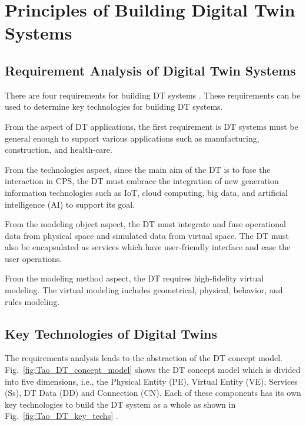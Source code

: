 \documentclass[article,table]{aaltoseries}
\begin{document}

\section{Principles of Building Digital Twin Systems}
\subsection{Requirement Analysis of Digital Twin Systems}
There are four requirements for building DT systems \cite{Tao2019}. These requirements can be used to determine key technologies for building DT systems.

From the aspect of DT applications, the first requirement is DT systems must be general enough to support various applications such as manufacturing, construction, and health-care.

From the technologies aspect, since the main aim of the DT is to fuse the interaction in CPS, the DT must embrace the integration of new generation information technologies such as IoT, cloud computing, big data, and artificial intelligence (AI) to support its goal.

From the modeling object aspect, the DT must integrate and fuse operational data from physical space and simulated data from virtual space. The DT must also be encapsulated as services which have user-friendly interface and ease the user operations.

From the modeling method aspect, the DT requires high-fidelity virtual modeling. The virtual modeling includes geometrical, physical, behavior, and rules modeling.

\subsection{Key Technologies of Digital Twins}
The requirements analysis leads to the abstraction of the DT concept model. Fig.~\ref{fig:Tao_DT_concept_model} shows the DT concept model which is divided into five dimensions, i.e., the Physical Entity (PE), Virtual Entity (VE), Services (Ss), DT Data (DD) and Connection (CN). Each of these components has its own key technologies to build the DT system as a whole as shown in Fig.~\ref{fig:Tao_DT_key_techs} \cite{Tao2019}.
\end{document}
